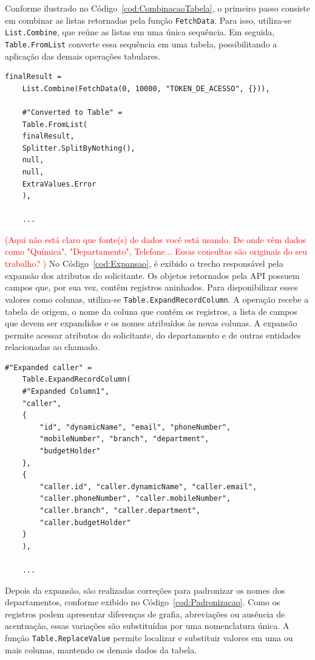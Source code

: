 Conforme ilustrado no Código~\ref{cod:CombinacaoTabela}, o primeiro passo consiste em combinar as listas retornadas pela função \texttt{FetchData}. Para isso, utiliza-se \texttt{List.Combine}, que reúne as listas em uma única sequência. Em seguida, \texttt{Table.FromList} converte essa sequência em uma tabela, possibilitando a aplicação das demais operações tabulares. \\

\begin{lstlisting}[caption={Trecho de código para combinação das respostas e conversão em tabela.}, label = {cod:CombinacaoTabela}]
	finalResult =
	List.Combine(FetchData(0, 10000, "TOKEN_DE_ACESSO", {})),
	
	#"Converted to Table" =
	Table.FromList(
	finalResult,
	Splitter.SplitByNothing(),
	null,
	null,
	ExtraValues.Error
	),
	
	...
\end{lstlisting}


\textcolor{red}{(Aqui não está claro que fonte(s) de dados você está usando. De onde vêm dados como "Química", "Departamento", Telefone...  Essas consultas são originais do seu trabalho? )}
No Código~\ref{cod:Expansao}, é exibido o trecho  responsável pela expansão dos atributos do solicitante.
Os objetos retornados pela API possuem campos que, por sua vez, contêm registros aninhados. Para disponibilizar esses valores como colunas, utiliza-se \texttt{Table.ExpandRecordColumn}. A operação recebe a tabela de origem, o nome da coluna que contém os registros, a lista de campos que devem ser expandidos e os nomes atribuídos às novas colunas. A expansão permite acessar atributos do solicitante, do departamento e de outras entidades relacionadas ao chamado.\\

\begin{lstlisting}[caption={Expansão dos atributos do solicitante.}, label = {cod:Expansao}]
	#"Expanded caller" =
	Table.ExpandRecordColumn(
	#"Expanded Column1",
	"caller",
	{
		"id", "dynamicName", "email", "phoneNumber",
		"mobileNumber", "branch", "department",
		"budgetHolder"
	},
	{
		"caller.id", "caller.dynamicName", "caller.email",
		"caller.phoneNumber", "caller.mobileNumber",
		"caller.branch", "caller.department",
		"caller.budgetHolder"
	}
	),
	
	...
\end{lstlisting}


Depois da expansão, são realizadas correções para padronizar os nomes dos departamentos, conforme exibido no Código~\ref{cod:Padronizacao}. Como os registros podem apresentar diferenças de grafia, abreviações ou ausência de acentuação, essas variações são substituídas por uma nomenclatura única. A função \texttt{Table.ReplaceValue} permite localizar e substituir valores em uma ou mais colunas, mantendo os demais dados da tabela.\\

